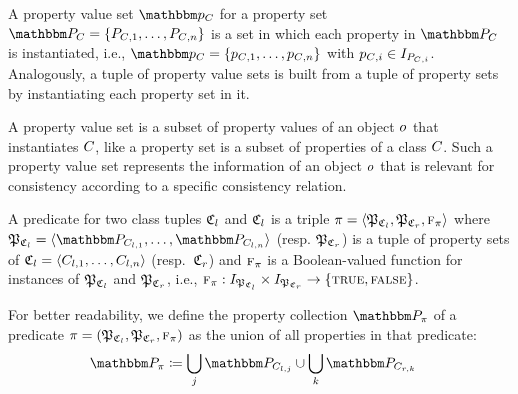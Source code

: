 \begin{definition}
A property value set $\propertyvalueset{p}{\class{C}{}}$ for a property set $\propertyset{P}{\class{C}{}} = \setted{P_{\class{C}{}, 1}, \dots, P_{\class{C}{}, n}}$ is a set in which each property in $\propertyset{P}{\class{C}{}}$ is instantiated, i.e., $\propertyvalueset{p}{\class{C}{}} = \setted{p_{\class{C}{}, 1}, \dots, p_{\class{C}{}, n}}$ with $p_{\class{C}{}, i} \in I_{P_{\class{C}{}, i}}$. 
Analogously, a tuple of property value sets is built from a tuple of property sets by instantiating each property set in it.
\end{definition}

A property value set is a subset of property values of an object $\object{o}{}$ that instantiates $\class{C}{}$, like a property set is a subset of properties of a class $\class{C}{}$. Such a property value set represents the information of an object $\object{o}{}$ that is relevant for consistency according to a specific consistency relation.

\begin{definition}[Predicate]
A predicate for two class tuples $\classtuple{C}{l}$ and $\classtuple{C}{l}$ is a triple $\pi = \tupled{\propertysettuple{P}{\classtuple{C}{l}}, \propertysettuple{P}{\classtuple{C}{r}}, \function{f}_\pi}$ where $\propertysettuple{P}{\classtuple{C}{l}} = \tupled{\propertyset{P}{\class{C}{l,1}}, \dots, \propertyset{P}{\class{C}{l,n}}}$ (resp. $\propertysettuple{P}{\classtuple{C}{r}}$) is a tuple of property sets of $\classtuple{C}{l} = \tupled{\class{C}{l,1}, \dots, \class{C}{l,n}}$ (resp.\ $\classtuple{C}{r}$) and $\textsc{f}_\pi$ is a Boolean-valued function for instances of $\tuple{P}_{\classtuple{C}{l}}$ and $\tuple{P}_{\classtuple{C}{r}}$, i.e., $\function{f}_\pi : \instances{\propertysettuple{P}{\classtuple{C}{l}}} \times \instances{\propertysettuple{P}{\classtuple{C}{r}}} \to \setted{\textsc{true}, \textsc{false}}$.
\end{definition}

For better readability, we define the property collection $\propertycollection{\pi}$ of a predicate $\pi = (\propertysettuple{P}{\classtuple{C}{l}}, \propertysettuple{P}{\classtuple{C}{r}}, \function{f}_\pi)$ as the union of all properties in that predicate:
\begin{align*}
    &
    \propertycollection{\pi} \equalsperdefinition \bigcup_{j} \propertyset{P}{\class{C}{l,j}} \cup \bigcup_{k} \propertyset{P}{\class{C}{r,k}}
\end{align*}

